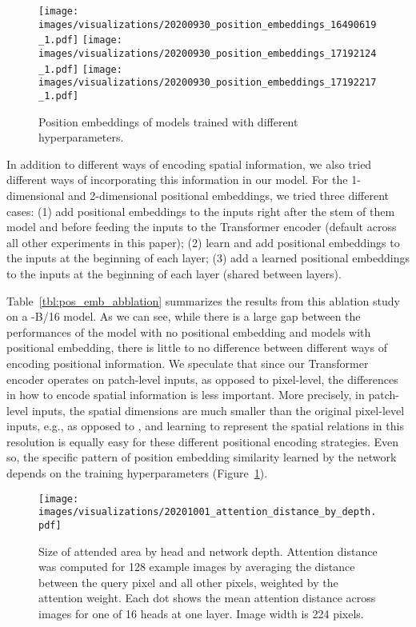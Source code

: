 \begin{figure}[t]
\texttt{[image: images/visualizations/20200930\_position\_embeddings\_16490619\_1.pdf]}
\hfill
\texttt{[image: images/visualizations/20200930\_position\_embeddings\_17192124\_1.pdf]}
\hfill
\texttt{[image: images/visualizations/20200930\_position\_embeddings\_17192217\_1.pdf]}
\caption{Position embeddings of models trained with different hyperparameters.}
\label{fig:position_embedding_comparison}
\end{figure}

In addition to different ways of encoding spatial information, we also tried different ways of incorporating this information in our model. For the 1-dimensional and 2-dimensional positional embeddings, we tried three different cases: (1) add positional embeddings to the inputs right after the stem of them model and before feeding the inputs to the Transformer encoder (default across all other experiments in this paper); (2) learn and add positional embeddings to the inputs at the beginning of each layer; (3) add a learned positional embeddings to the inputs at the beginning of each layer (shared between layers).

Table~\ref{tbl:pos_emb_abblation} summarizes the results from this ablation study on a \oursabbrv-B/16 model. As we can see, while there is a large gap between the performances of the model with no positional embedding and models with positional embedding, there is little to no difference between different ways of encoding positional information. We speculate that since our Transformer encoder operates on patch-level inputs, as opposed to pixel-level, the differences in how to encode spatial information is less important. More precisely, in patch-level inputs, the spatial dimensions are much smaller than the original pixel-level inputs, e.g.,  as opposed to , and learning to represent the spatial relations in this resolution is equally easy for these different positional encoding strategies.
Even so, the specific pattern of position embedding similarity learned by the network depends on the training hyperparameters (Figure~\ref{fig:position_embedding_comparison}).

\begin{figure}[h]
\begin{center}
\texttt{[image: images/visualizations/20201001\_attention\_distance\_by\_depth.pdf]}
\end{center}
\caption{Size of attended area by head and network depth. Attention distance was computed for 128 example images by averaging the distance between the query pixel and all other pixels, weighted by the attention weight. Each dot shows the mean attention distance across images for one of 16 heads at one layer. Image width is 224 pixels.}
\label{fig:attention_distance}
\end{figure}


